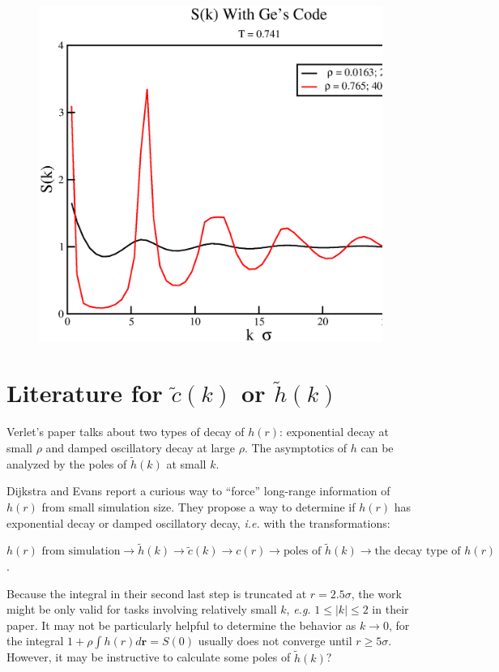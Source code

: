 \documentclass[journal=jacsat,manuscript=article]{achemso}
\begin{document}
\begin{figure}[H]
    \centering
    \includegraphics[width=6.0in]{PrelimGeSk.eps}
    \caption{}
    \label{fig:my_label1}
\end{figure}

\section{Literature for $\tilde{c}(k)$ or $\tilde{h}(k)$}
    
    Verlet's paper\cite{Verlet1968} talks about two types of decay of $h(r)$: exponential decay at small $\rho$ and damped oscillatory decay at  large $\rho$. The asymptotics of $h$ can be analyzed by the poles of $\tilde{h}(k)$ at small $k$.

	Dijkstra and Evans\cite{Dijkstra2000} report a curious way to ``force'' long-range information of $h(r)$ from small simulation size. They propose a way to determine if $h(r)$ has exponential decay or damped oscillatory decay, \textit{i.e.} with the transformations:
	
	 $h(r)\text{ from simulation}\rightarrow \tilde{h}(k)\rightarrow \tilde{c}(k) \rightarrow c(r)\rightarrow\text{poles of }\tilde{h}(k)\rightarrow\text{the decay type of }h(r)$.
	
	Because the integral in their second last step is truncated at $r=2.5\sigma$, the work might be only valid for tasks involving relatively small $k$, \textit{e.g.} $1\leq |k| \leq 2$ in their paper. It may not be particularly helpful to determine the behavior as $k\rightarrow 0$, for the integral $1+\rho\int h(r)d\mathbf{r}=S(0)$ usually does not converge until $r\geq 5\sigma$. However, it may be instructive to calculate some poles of $\tilde{h}(k)$?
	
\end{document}
